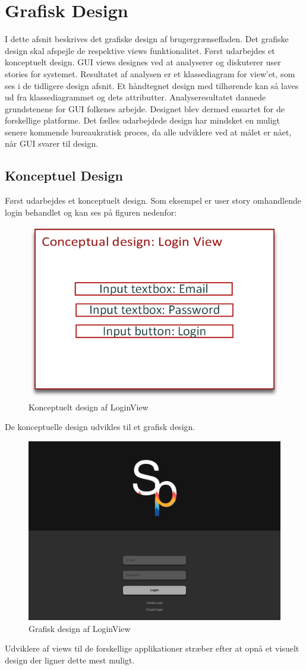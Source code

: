 \chapter{Grafisk Design}
I dette afsnit beskrives det grafiske design af brugergrænsefladen. Det grafiske design skal afspejle de respektive views funktionalitet. Først udarbejdes et konceptuelt design. GUI views designes ved at analyserer og diskuterer user stories for systemet. Resultatet af analysen er et klassediagram for view'et, som ses i de tidligere design afsnit. Et håndtegnet design med tilhørende kan så laves ud fra klassediagrammet og dets attributter.
Analyseresultatet dannede grundstenene for GUI folkenes arbejde. Designet blev dermed ensartet for de forskellige platforme. Det fælles udarbejdede design har mindsket en muligt senere kommende bureaukratisk proces, da alle udviklere ved at målet er nået, når GUI svarer til design. 

\section{Konceptuel Design}
Først udarbejdes et konceptuelt design. Som eksempel er user story omhandlende login behandlet og kan ses på figuren nedenfor:

\begin{figure}
	\centering
	\includegraphics[width=0.5\linewidth]{figs/design/concuptuel_design_loginview}
	\caption{Konceptuelt design af LoginView}
	\label{fig:conceptualdesignview}
\end{figure}

De konceptuelle design udvikles til et grafisk design.

\begin{figure}
	\centering
	\includegraphics[width=0.5\linewidth]{figs/design/DesktopHDLogin}
	\caption{Grafisk design af LoginView}
	\label{fig:graphicaldesign}
\end{figure}
Udviklere af views til de forskellige applikationer stræber efter at opnå et visuelt design der ligner dette mest muligt.
